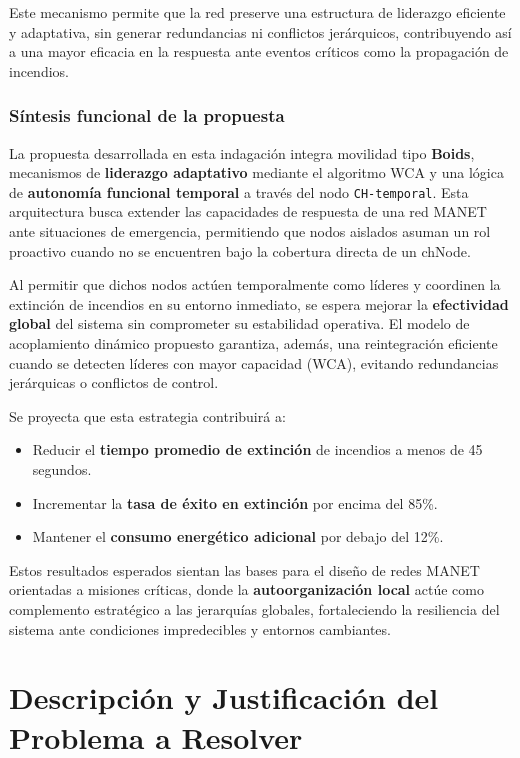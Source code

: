 \documentclass{article}
\begin{document}
Este mecanismo permite que la red preserve una estructura de liderazgo eficiente y adaptativa, sin generar redundancias ni conflictos jerárquicos, contribuyendo así a una mayor eficacia en la respuesta ante eventos críticos como la propagación de incendios.


\subsubsection{Síntesis funcional de la propuesta}

La propuesta desarrollada en esta indagación integra movilidad tipo \textbf{Boids}, mecanismos de \textbf{liderazgo adaptativo} mediante el algoritmo WCA y una lógica de \textbf{autonomía funcional temporal} a través del nodo \texttt{CH-temporal}. Esta arquitectura busca extender las capacidades de respuesta de una red MANET ante situaciones de emergencia, permitiendo que nodos aislados asuman un rol proactivo cuando no se encuentren bajo la cobertura directa de un chNode.

Al permitir que dichos nodos actúen temporalmente como líderes y coordinen la extinción de incendios en su entorno inmediato, se espera mejorar la \textbf{efectividad global} del sistema sin comprometer su estabilidad operativa. El modelo de acoplamiento dinámico propuesto garantiza, además, una reintegración eficiente cuando se detecten líderes con mayor capacidad (WCA), evitando redundancias jerárquicas o conflictos de control.

Se proyecta que esta estrategia contribuirá a:
\begin{itemize}
    \item Reducir el \textbf{tiempo promedio de extinción} de incendios a menos de 45 segundos.
    \item Incrementar la \textbf{tasa de éxito en extinción} por encima del 85\%.
    \item Mantener el \textbf{consumo energético adicional} por debajo del 12\%.
\end{itemize}

Estos resultados esperados sientan las bases para el diseño de redes MANET orientadas a misiones críticas, donde la \textbf{autoorganización local} actúe como complemento estratégico a las jerarquías globales, fortaleciendo la resiliencia del sistema ante condiciones impredecibles y entornos cambiantes.

\section{Descripción y Justificación del Problema a Resolver}\label{sec:descr}
\end{document}
